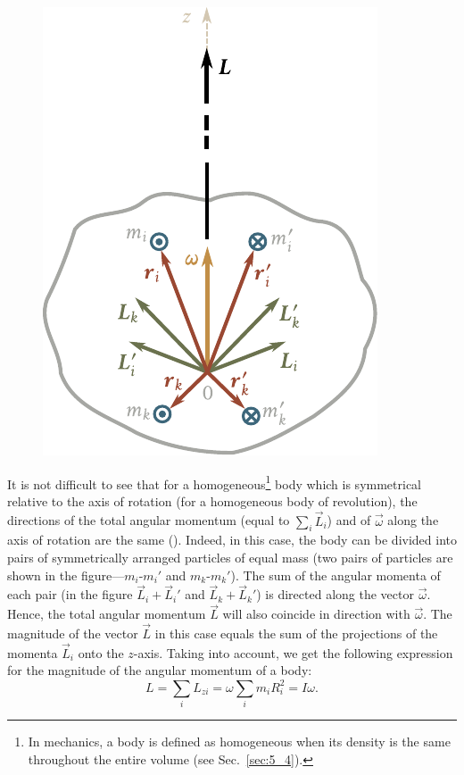 \begin{figure}[t]
	\begin{center}
		\includegraphics[scale=0.95]{figures/ch_05/fig_5_5.pdf}
		\caption[]{}
		\label{fig:5_5}
	\end{center}
\vspace{-1.0cm}
\end{figure}

It is not difficult to see that for a homogeneous\footnote{In mechanics, a body is defined as homogeneous when its density is the same throughout the entire volume (see Sec.~\ref{sec:5_4}).} body which is symmetrical relative to the axis of rotation (for a homogeneous body of revolution), the directions of the total angular momentum (equal to $\sum_i\vec{L}_i$) and of $\vec{\omega}$ along the axis of rotation are the same (). Indeed, in this case, the body can be divided into pairs of symmetrically arranged particles of equal mass (two pairs of particles are shown in the figure---$m_i$-$m_i'$ and $m_k$-$m_k'$). The sum of the angular momenta of each pair (in the figure $\vec{L}_i+\vec{L}_i'$ and $\vec{L}_k+\vec{L}_k'$) is directed along the vector $\vec{\omega}$. Hence, the total angular momentum $\vec{L}$ will also coincide in direction with $\vec{\omega}$. The magnitude of the vector $\vec{L}$ in this case equals the sum of the projections of the momenta $\vec{L}_i$ onto the $z$-axis. Taking  into account, we get the following expression for the magnitude of the angular momentum of a body:
\begin{equation}\label{eq:5_10}
L = \sum_i L_{zi} = \omega \sum_i m_i R_i^2 = I \omega.
\end{equation}

